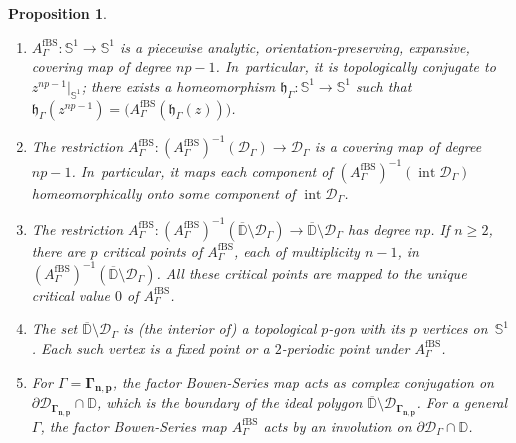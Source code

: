 \documentclass[JEP,XML,SOM,Unicode,NoFloatCountersInSection,published]{cedram}
\newtheorem{proposition}[lemma]{Proposition}
\theoremstyle{definition}
\theoremstyle{remark}
\newcommand{\D}{\mathbb{D}}
\DeclareMathOperator{\Int}{int}
\begin{document}
\skpt
\begin{proposition}\label{factor_bs_prop}
\begin{enumerate}
\item\label{factor_bs_prop1} $A_{\Gamma}^{\mathrm{fBS}}:\mathbb{S}^1\to\mathbb{S}^1$ is a piecewise analytic, orientation-preserving, expansive, covering map of degree $np-1$. In~particular, it is topologically conjugate to $z^{np-1}\vert_{\mathbb{S}^1}$; \ie there exists a homeomorphism $\mathfrak{h}_\Gamma: {\mathbb{S}^1} \to {\mathbb{S}^1}$ such that $\mathfrak{h}_\Gamma (z^{np-1}) = \big( A_{\Gamma}^{\mathrm{fBS}}(\mathfrak{h}_\Gamma (z))\big)$.

\item\label{factor_bs_prop2} The restriction $A_{\Gamma}^{\mathrm{fBS}}: \left(A_{\Gamma}^{\mathrm{fBS}}\right)^{-1}(\mathcal{D}_{\Gamma})\to \mathcal{D}_{\Gamma}$ is a covering map of degree $np-1$. In~particular, it maps each component of $\left(A_{\Gamma}^{\mathrm{fBS}}\right)^{-1}(\Int{\mathcal{D}_{\Gamma}})$ homeomorphically onto some component of $\Int{\mathcal{D}_{\Gamma}}$.

\item\label{factor_bs_prop3} The restriction $A_{\Gamma}^{\mathrm{fBS}}: \left(A_{\Gamma}^{\mathrm{fBS}}\right)^{-1}(\overline{\D}\setminus\mathcal{D}_{\Gamma})\to \overline{\D}\setminus\mathcal{D}_{\Gamma}$ has degree $np$. If $n\geq 2$, there are $p$ critical points of $A_{\Gamma}^{\mathrm{fBS}}$, each of multiplicity $n-1$, in $\left(A_{\Gamma}^{\mathrm{fBS}}\right)^{-1}(\overline{\D}\setminus\mathcal{D}_{\Gamma})$.
All these critical points are mapped to the unique critical value $0$ of $A_{\Gamma}^{\mathrm{fBS}}$.

\item\label{factor_bs_prop4} The set $\overline{\D}\setminus\mathcal{D}_\Gamma$ is (the interior of) a topological $p$-gon with its $p$ vertices on~$\mathbb{S}^1$. Each such vertex is a fixed point or a $2$-periodic point under $A_{\Gamma}^{\mathrm{fBS}}$.

\item\label{factor_bs_prop5} For $\Gamma=\pmb{\Gamma_{n,p}}$, the factor Bowen-Series map acts as complex conjugation on $\partial\mathcal{D}_{\pmb{\Gamma_{n,p}}}\cap\D$, which is the boundary of the ideal polygon $\overline{\D}\setminus\mathcal{D}_{\pmb{\Gamma_{n,p}}}$. For a general $\Gamma$, the factor Bowen-Series map $A_{\Gamma}^{\mathrm{fBS}}$ acts by an involution on $\partial\mathcal{D}_{\Gamma}\cap\D$.
\end{enumerate}
\end{proposition}
\end{document}
